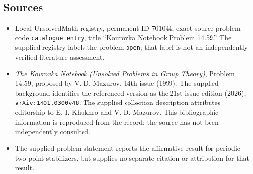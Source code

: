 \documentclass[11pt]{article}
\begin{document}
\subsection{Sources}
\begin{itemize}
\item Local UnsolvedMath registry, permanent ID \(701044\), exact source problem code \texttt{catalogue entry}, title ``Kourovka Notebook Problem 14.59.'' The supplied registry labels the problem \texttt{open}; that label is not an independently verified literature assessment.
\item \emph{The Kourovka Notebook (Unsolved Problems in Group Theory)}, Problem 14.59, proposed by V. D. Mazurov, 14th issue (1999). The supplied background identifies the referenced version as the 21st issue edition (2026), \texttt{arXiv:1401.0300v48}. The supplied collection description attributes editorship to E. I. Khukhro and V. D. Mazurov. This bibliographic information is reproduced from the record; the source has not been independently consulted.
\item The supplied problem statement reports the affirmative result for periodic two-point stabilizers, but supplies no separate citation or attribution for that result.
\end{itemize}
\end{document}

